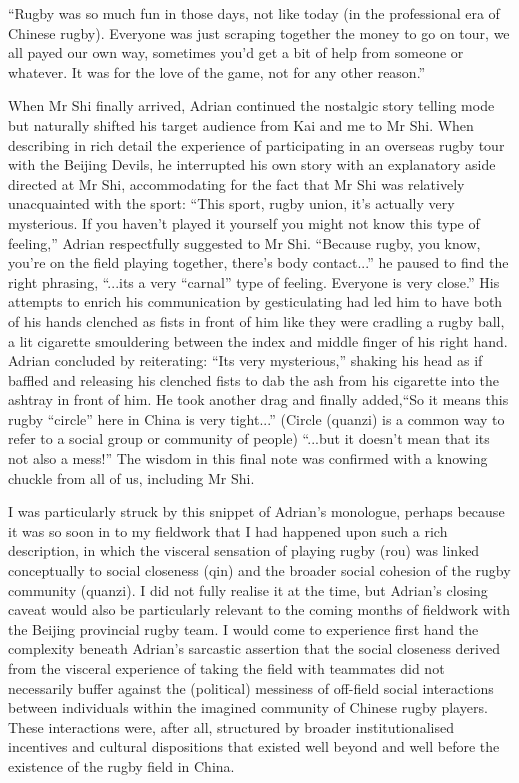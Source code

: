  ``Rugby was so much fun in those days, not like today (in the professional era of Chinese rugby).  Everyone was just scraping together the money to go on tour, we all payed our own way, sometimes you'd get a bit of help from someone or whatever. It was for the love of the game, not for any other reason.''

When Mr Shi finally arrived, Adrian continued the nostalgic story telling mode but naturally shifted his target audience from Kai and me to Mr Shi.  When describing in rich detail the experience of participating in an overseas rugby tour with the Beijing Devils, he interrupted his own story with an explanatory aside directed at Mr Shi, accommodating for the fact that Mr Shi was relatively unacquainted with the sport: ``This sport, rugby union, it's actually very mysterious. If you haven't played it yourself you might not know this type of feeling,'' Adrian respectfully suggested to Mr Shi. ``Because rugby, you know, you're on the field playing together, there's body contact...'' he paused to find the right phrasing,  ``...its a very ``carnal'' type of feeling. Everyone is very close.'' His attempts to enrich his communication by gesticulating had led him to have both of his hands clenched as fists in front of him like they were cradling a rugby ball, a lit cigarette smouldering between the index and middle finger of his right hand.  Adrian concluded by reiterating: ``Its very mysterious,'' shaking his head as if baffled and releasing his clenched fists to dab the ash from his cigarette into the ashtray in front of him. He took another drag and  finally added,``So it means this rugby ``circle'' here in China is very tight...'' (Circle (quanzi) is a common way to refer to a social group or community of people) ``...but it doesn't mean that its not also a mess!'' The wisdom in this final note was confirmed with a knowing chuckle from all of us, including Mr Shi.


I was particularly struck by this snippet of Adrian's monologue, perhaps because it was so soon in to my fieldwork that I had happened upon such a rich description, in which the visceral sensation of playing rugby (rou) was linked conceptually to social closeness (qin) and the broader social cohesion of the rugby community (quanzi).  I did not fully realise it at the time, but Adrian's closing caveat would also be particularly relevant to the coming months of fieldwork with the Beijing provincial rugby team. I would come to experience first hand the complexity beneath Adrian's sarcastic assertion that the social closeness derived from the visceral experience of taking the field with teammates did not necessarily buffer against the (political) messiness of off-field social interactions between individuals within the imagined community of Chinese rugby players.  These interactions were, after all, structured by broader institutionalised incentives and cultural dispositions that existed well beyond and well before the existence of the rugby field in China.

